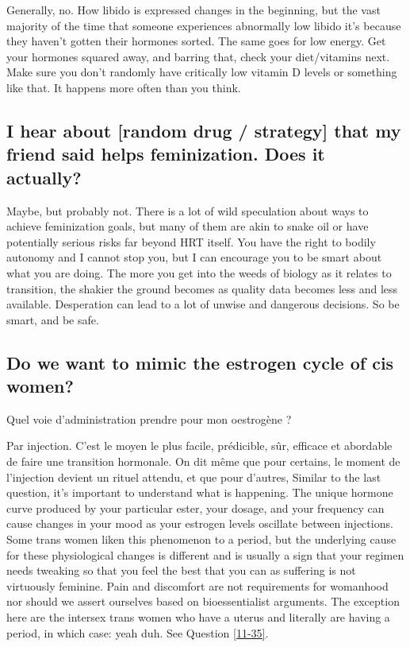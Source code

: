 \documentclass{article}
\begin{document}
{{Generally, no. How libido is expressed changes in the beginning, but the vast majority of the time that someone experiences abnormally low libido it’s because they haven’t gotten their hormones sorted. The same goes for low energy. Get your hormones squared away, and barring that, check your diet/vitamins next. Make sure you don’t randomly have critically low vitamin D levels or something like that. It happens more often than you think.

\subsection{I hear about [random drug / strategy] that my friend said helps feminization. Does it actually?}

Maybe, but probably not. There is a lot of wild speculation about ways to achieve feminization goals, but many of them are akin to snake oil or have potentially serious risks far beyond HRT itself. You have the right to bodily autonomy and I cannot stop you, but I can encourage you to be smart about what you are doing. The more you get into the weeds of biology as it relates to transition, the shakier the ground becomes as quality data becomes less and less available. Desperation can lead to a lot of unwise and dangerous decisions. So be smart, and be safe. 

\subsection{Do we want to mimic the estrogen cycle of cis women?}\label{11-10}

Quel voie d'administration prendre pour mon oestrogène ?

Par injection. C'est le moyen le plus facile, prédicible, sûr, efficace et abordable de faire une transition hormonale. On dit même que pour certains, le moment de l'injection devient un rituel attendu, et que pour d'autres,  
Similar to the last question, it’s important to understand what is happening. The unique hormone curve produced by your particular ester, your dosage, and your frequency can cause changes in your mood as your estrogen levels oscillate between injections. Some trans women liken this phenomenon to a period, but the underlying cause for these physiological changes is different and is usually a sign that your regimen needs tweaking so that you feel the best that you can as suffering is not virtuously feminine. Pain and discomfort are not requirements for womanhood nor should we assert ourselves based on bioessentialist arguments. The exception here are the intersex trans women who have a uterus and literally are having a period, in which case: yeah duh. See Question \ref{11-35}.

}}
\end{document}
